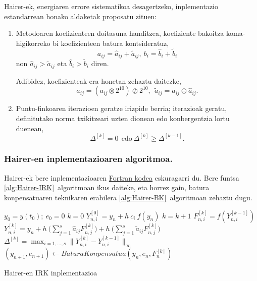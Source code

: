 Hairer-ek, energiaren errore sistematikoa desagertzeko, inplementazio estandarrean honako aldaketak proposatu zituen:
\begin{enumerate}
\item Metodoaren koefizienteen doitasuna handitzea, koefiziente bakoitza koma-higikorreko bi koefizienteen batura kontsideratuz,
\begin{equation}
\label{eq:hkoef}
a_{ij}= \hat a_{ij}+\tilde a_{ij}, \ b_i= \hat b_i+\tilde b_i
\end{equation} 
non $\hat a_{ij}>\tilde a_{ij}$ eta  $\hat b_i>\tilde b_i$ diren. 

Adibidez, koefizienteak era honetan zehaztu daitezke,
\begin{equation*}
\hat a_{ij}=(a_{ij} \otimes 2^{10}) \oslash 2^{10},\ \ \tilde a_{ij}= a_{ij}\ominus \hat a_{ij}.
\end{equation*}

\item Puntu-finkoaren iterazioen geratze irizpide berria; iterazioak geratu, definitutako norma txikitzeari uzten dionean edo konbergentzia lortu duenean,
\begin{equation}
\label{eq:hstop}
\Delta^{[k]} = 0 \ \ \text{edo} \  \Delta^{[k]} \geqslant \Delta^{[k-1]}.
\end{equation}
  	 	
\end{enumerate}

\subsubsection*{Hairer-en inplementazioaren algoritmoa.}

Hairer-ek bere inplementazioaren \href{http://www.unige.ch/~hairer/preprints.html}{Fortran kodea}  eskuragarri du. Bere funtsa \ref{alg:Hairer-IRK}~algoritmoan ikus daiteke, eta horrez gain, batura konpensatuaren teknikaren erabilera \ref{alg:Hairer-BK}~algoritmoan zehaztu dugu. 
 
\begin{algorithm}[h!]
 \BlankLine
  $y_0=y(t_0); \ e_0=0$\;
  {
   \BlankLine
   $k=0$\;
   $Y_{n,i}^{[0]}=y_n+h \ c_i \ f(y_n) $\; 
   \BlankLine
   {
    \BlankLine 
    $k=k+1$\;
    $F_{n,i}^{[k]}=f(Y_{n,i}^{[k-1]}) $\;
    $Y_{n,i}^{[k]}=y_n+ h \ \big(\sum\limits_{j=1}^{s} \hat a_{ij} F_{n,j}^{[k]} \big) 
                          + h \ \big(\sum\limits_{j=1}^{s} \tilde a_{ij} F_{n,j}^{[k]} \big)$\; 
    $\Delta ^{[k]} = \max_{i=1,\dots,s}\|Y_{n,i}^{[k]}-Y_{n,i}^{[k-1]}\|_{\infty}$\;
   }
   \BlankLine
   $(y_{n+1},e_{n+1})\leftarrow BaturaKonpensatua(y_n,e_n,F_n^{[k]})$\;      
   \BlankLine
 }
 \caption{Hairer-en IRK inplementazioa}
 \label{alg:Hairer-IRK}
\end{algorithm}


